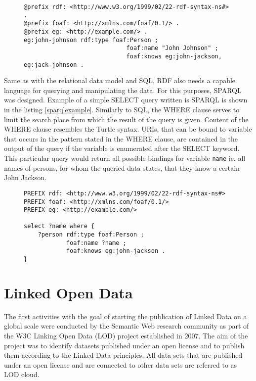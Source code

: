 \begin{figure}[h]
\begin{lstlisting}[language = turtle, caption={Example of RDF data described in Turtle format (Source: author)}, label={turtleexample},captionpos=b escapeinside={(*@}{@*)}]
@prefix rdf: <http://www.w3.org/1999/02/22-rdf-syntax-ns#> .
@prefix foaf: <http://xmlns.com/foaf/0.1/> .
@prefix eg: <http://example.com/> .
eg:john-johnson rdf:type foaf:Person ;
                             foaf:name "John Johnson" ;
                             foaf:knows eg:john-jackson, eg:jack-johnson .
\end{lstlisting}
\end{figure}

Same as with the relational data model and SQL, RDF also needs a capable language for querying and manipulating the data. For this purposes, SPARQL was designed.\cite{sparqlw3c2008} Example of a simple SELECT query written is SPARQL is shown in the listing \ref{sparqlexample}. Similarly to SQL, the WHERE clause serves to limit the search place from which the result of the query is given. Content of the WHERE clause resembles the Turtle syntax. URIs, that can be bound to variable that occurs in the pattern stated in the WHERE clause, are contained in the output of the query if the variable is enumerated after the SELECT keyword. This particular query would return all possible bindings for variable \verb|name| ie. all names of persons, for whom the queried data states, that they know a certain John Jackson.

\begin{figure}[h]
\begin{lstlisting}[language = SPARQL, caption={Example of a simple SPARQL query (Source: author)}, label={sparqlexample},captionpos=b escapeinside={(*@}{@*)}]
PREFIX rdf: <http://www.w3.org/1999/02/22-rdf-syntax-ns#>
PREFIX foaf: <http://xmlns.com/foaf/0.1/>
PREFIX eg: <http://example.com/>

select ?name where {
    ?person rdf:type foaf:Person ;
            foaf:name ?name ;
            foaf:knows eg:john-jackson .
}
\end{lstlisting}
\end{figure}


\section{Linked Open Data}

The first activities with the goal of starting the publication of Linked Data on a global scale were conducted by the Semantic Web research community as part of the W3C Linking Open Data (LOD) project established in 2007.\cite{Heath2011} The aim of the project was to identify datasets published under an open license and to publish them according to the Linked Data principles. All data sets that are published under an open license and are connected to other data sets are referred to as LOD cloud. 

